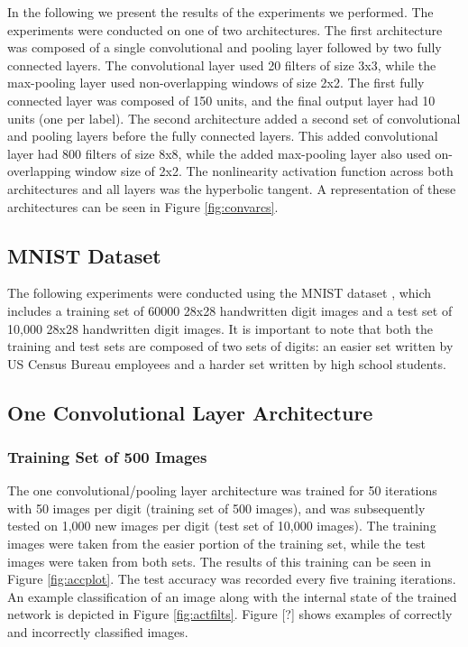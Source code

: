 \documentclass[10pt,twocolumn,letterpaper]{article}
\begin{document}
In the following we present the results of the experiments we performed. The experiments were conducted
on one of two architectures. The first architecture was composed of a single convolutional and pooling
layer followed by two fully connected layers. The convolutional layer used 20 filters of size 3x3,
while the max-pooling layer used non-overlapping windows of size 2x2. The first fully connected layer
was composed of 150 units, and the final output layer had 10 units (one per label). The second
architecture added a second set of convolutional and pooling layers before the fully connected layers.
This added convolutional layer had 800 filters of size 8x8, while the added max-pooling layer also used
on-overlapping window size of 2x2. The nonlinearity activation function across both architectures and
all layers was the hyperbolic tangent. A representation of these architectures can be seen in Figure
\ref{fig:convarcs}.

\subsection{MNIST Dataset}

The following experiments were conducted using the MNIST dataset \cite{MNIST}, which includes a training set of
60000 28x28 handwritten digit images and a test set of 10,000 28x28 handwritten digit images.
It is important to note that both the training and test sets are composed of two sets of digits:
an easier set written by US Census Bureau employees and a harder set written by high school students.

\subsection{One Convolutional Layer Architecture}

\subsubsection{Training Set of 500 Images}

The one convolutional/pooling layer architecture was trained for 50 iterations with 50 images per digit
(training set of 500 images), and was subsequently tested on
1,000 new images per digit (test set of 10,000 images).
The training images were taken from the easier portion of the training set, while the test images were taken from
both sets. The results of this training can be seen in Figure \ref{fig:accplot}. The test accuracy was recorded every five training
iterations. An example classification of an image along with the internal state of the trained network is depicted
in Figure \ref{fig:actfilts}. Figure [?] shows examples of correctly and incorrectly classified images.
\end{document}

